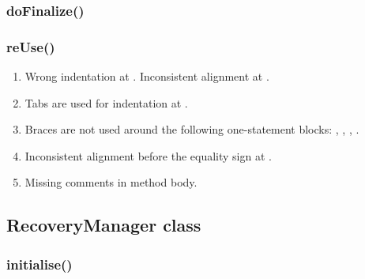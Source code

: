 \subsubsection{doFinalize()}

\subsubsection{reUse()}
\begin{enumerate}
    \item {} Wrong indentation at . Inconsistent alignment at .
    \item {} Tabs are used for indentation at .
    \item {} Braces are not used around the following one-statement blocks: , , , .
    \item {} Inconsistent alignment before the equality sign at .
    \item {} Missing comments in method body.
\end{enumerate}


\subsection{RecoveryManager class}

\subsubsection{initialise()}
